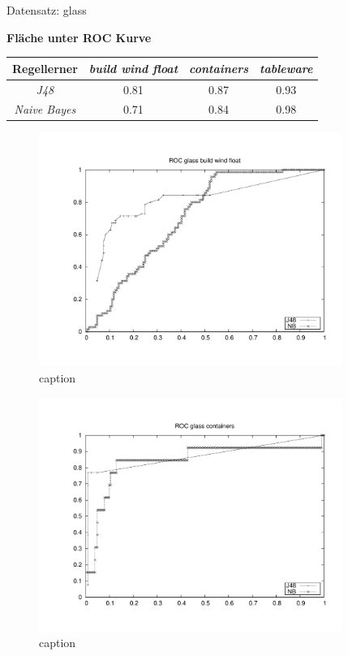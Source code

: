 Datensatz: glass

\textbf{Fl\"ache unter ROC Kurve}
\begin{table}[htb]
	\centering
\begin{tabular}{c|c|c|c}
				Regellerner       & \emph{build wind float} & \emph{containers} & \emph{tableware}  \\ \hline
				\emph{J48}			& 0.81 & 0.87 & 0.93  \\ \hline
				\emph{Naive Bayes}  & 0.71 & 0.84 & 0.98  
\end{tabular}
\end{table}

\begin{figure}[htbp]
	\centering
		\includegraphics[height=3in]{pics/a3/ROC_glass_build_wind_float.pdf}
	\caption{caption}
	\label{fig:pics_a3_ROC_glass_build_wind_float}
\end{figure}

\begin{figure}[htbp]
	\centering
		\includegraphics[height=3in]{pics/a3/ROC_glass_containers.pdf}
	\caption{caption}
	\label{fig:pics_a3_ROC_glass_containers}
\end{figure}

